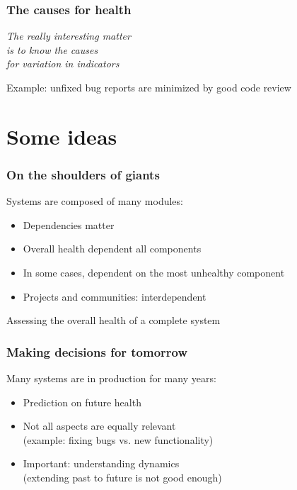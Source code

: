 \documentclass[17pt,aspectratio=169,hyperref=pdfusetitle]{beamer}
\begin{document}
\begin{frame}[fragile]
  \frametitle{The causes for health}

  {\em
  The really interesting matter \\
  is to know the causes \\
  for variation in indicators \\
  }
  \vspace{.5cm}
  
  Example: unfixed bug reports are minimized by good code review
  
\end{frame}


\section{Some ideas}

\begin{frame}[fragile]
  \frametitle{On the shoulders of giants}

  Systems are composed of many modules:

  \begin{itemize}
  \item Dependencies matter
  \item Overall health dependent all components
  \item In some cases, dependent on the most unhealthy component
  \item Projects and communities: interdependent
  \end{itemize}

  Assessing the overall health of a complete system
  
\end{frame}

\begin{frame}[fragile]
  \frametitle{Making decisions for tomorrow}

  Many systems are in production for many years:

  \begin{itemize}
  \item Prediction on future health
  \item Not all aspects are equally relevant \\
    (example: fixing bugs vs. new functionality)
  \item Important: understanding dynamics \\
    (extending past to future is not good enough)
  \end{itemize}
\end{frame}
\end{document}
